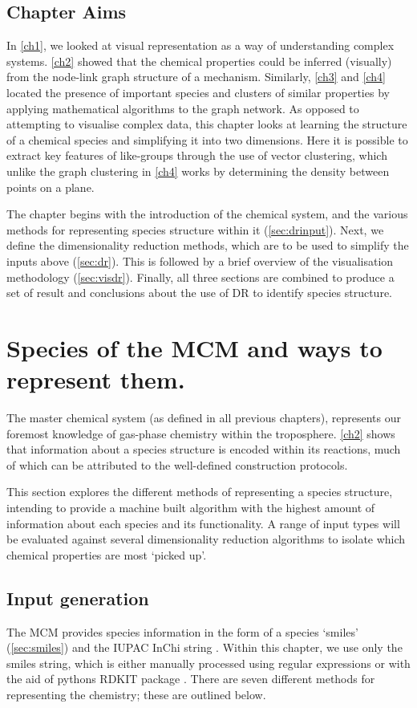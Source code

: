 \subsection*{Chapter Aims}
In \autoref{ch1}, we looked at visual representation as a way of understanding complex systems. \autoref{ch2} showed that the chemical properties could be inferred (visually) from the node-link graph structure of a mechanism. Similarly, \autoref{ch3} and \autoref{ch4} located the presence of important species and clusters of similar properties by applying mathematical algorithms to the graph network. As opposed to attempting to visualise complex data, this chapter looks at learning the structure of a chemical species and simplifying it into two dimensions. Here it is possible to extract key features of like-groups through the use of vector clustering, which unlike the graph clustering in \autoref{ch4} works by determining the density between points on a plane.  

The chapter begins with the introduction of the chemical system, and the various methods for representing species structure within it (\autoref{sec:drinput}). Next, we define the dimensionality reduction methods, which are to be used to simplify the inputs above (\autoref{sec:dr}). This is followed by a brief overview of the visualisation methodology (\autoref{sec:visdr}). Finally, all three sections are combined to produce a set of result and conclusions about the use of DR to identify species structure.  



\section{Species of the MCM and ways to represent them.}\label{sec:drinput}
The master chemical system (as defined in all previous chapters), represents our foremost knowledge of gas-phase chemistry within the troposphere.  \autoref{ch2} shows that information about a species structure is encoded within its reactions, much of which can be attributed to the well-defined construction protocols. 

This section explores the different methods of representing a species structure, intending to provide a machine built algorithm with the highest amount of information about each species and its functionality. A range of input types will be evaluated against several dimensionality reduction algorithms to isolate which chemical properties are most `picked up'. 

\subsection{Input generation}
The MCM provides species information in the form of a species `smiles' (\autoref{sec:smiles}) and the IUPAC InChi string \citep{inchi}. Within this chapter, we use only the smiles string, which is either manually processed using regular expressions or with the aid of pythons RDKIT package \citep{rdkit}. There are seven different methods for representing the chemistry; these are outlined below. 



